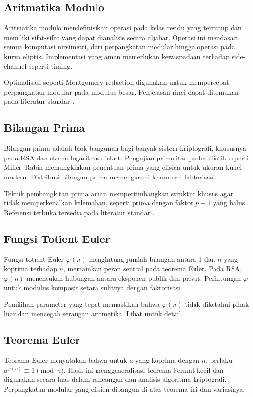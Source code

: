 \documentclass[../main.tex]{subfiles}
\begin{document}
\subsection{Aritmatika Modulo}
Aritmatika modulo mendefinisikan operasi pada kelas residu yang tertutup dan memiliki sifat-sifat yang dapat dianalisis secara aljabar. Operasi ini mendasari semua komputasi nirsimetri, dari perpangkatan modular hingga operasi pada kurva eliptik. Implementasi yang aman memerlukan kewaspadaan terhadap side-channel seperti timing.

Optimalisasi seperti Montgomery reduction digunakan untuk mempercepat perpangkatan modular pada modulus besar. Penjelasan rinci dapat ditemukan pada literatur standar \parencite{menezes1996handbook}.

\subsection{Bilangan Prima}
Bilangan prima adalah blok bangunan bagi banyak sistem kriptografi, khususnya pada RSA dan skema logaritma diskrit. Pengujian primalitas probabilistik seperti Miller–Rabin memungkinkan penentuan prima yang efisien untuk ukuran kunci modern. Distribusi bilangan prima memengaruhi keamanan faktorisasi.

Teknik pembangkitan prima aman mempertimbangkan struktur khusus agar tidak memperkenalkan kelemahan, seperti prima dengan faktor \(p-1\) yang halus. Referensi terbuka tersedia pada literatur standar \parencite{menezes1996handbook}.

\subsection{Fungsi Totient Euler}
Fungsi totient Euler \(\varphi(n)\) menghitung jumlah bilangan antara 1 dan \(n\) yang koprima terhadap \(n\), memainkan peran sentral pada teorema Euler. Pada RSA, \(\varphi(n)\) menentukan hubungan antara eksponen publik dan privat. Perhitungan \(\varphi\) untuk modulus komposit setara sulitnya dengan faktorisasi.

Pemilihan parameter yang tepat memastikan bahwa \(\varphi(n)\) tidak diketahui pihak luar dan mencegah serangan aritmetika. Lihat \textcite{menezes1996handbook} untuk detail.

\subsection{Teorema Euler}
Teorema Euler menyatakan bahwa untuk \(a\) yang koprima dengan \(n\), berlaku \(a^{\varphi(n)} \equiv 1 \pmod{n}\). Hasil ini menggeneralisasi teorema Fermat kecil dan digunakan secara luas dalam rancangan dan analisis algoritma kriptografi. Perpangkatan modular yang efisien dibangun di atas teorema ini dan variasinya.
\end{document}
